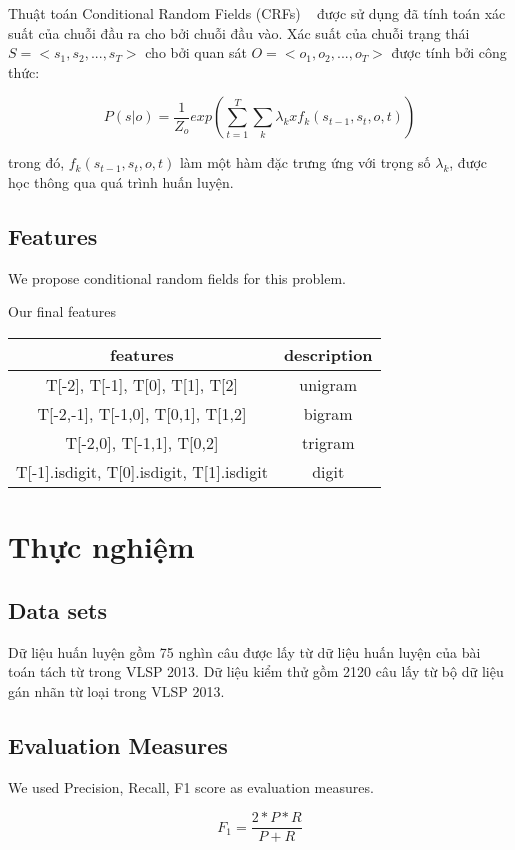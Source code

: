 \documentclass[11pt,a4paper]{article}
\begin{document}
Thuật toán Conditional Random Fields (CRFs) ~\cite{Lafferty:2001:CRF:645530.655813} được sử dụng đã tính toán xác suất của chuỗi đầu ra cho bởi chuỗi đầu vào. Xác suất của chuỗi trạng thái $S = <s_1, s_2,..., s_T>$ cho bởi quan sát $O = <o_1, o_2, ..., o_T>$ được tính bởi công thức:

$$P(s|o) = \frac{1}{Z_o} exp( \sum_{t=1}^{T} \sum_{k} \lambda_k x f_k (s_{t-1},s_t,o,t) )$$

trong đó, $f_k (s_{t-1},s_t,o,t)$ làm một hàm đặc trưng ứng với trọng số $\lambda_k$, được học thông qua quá trình huấn luyện.

\subsection{Features}
We propose conditional random fields for this problem.

Our final features
\begin{center}
\begin{tabular}{ |c|c| }
 \hline
 features & description \\
 \hline
 T[-2], T[-1], T[0], T[1], T[2] & unigram  \\
 T[-2,-1], T[-1,0], T[0,1], T[1,2] & bigram  \\
 T[-2,0], T[-1,1], T[0,2] & trigram \\
 T[-1].isdigit, T[0].isdigit, T[1].isdigit & digit
 \hline
\end{tabular}
\end{center}

\section{Thực nghiệm}

\subsection{Data sets}

Dữ liệu huấn luyện gồm 75 nghìn câu được lấy từ dữ liệu huấn luyện của bài toán tách từ trong VLSP 2013. Dữ liệu kiểm thử gồm 2120 câu lấy từ bộ dữ liệu gán nhãn từ loại trong VLSP 2013.

\subsection{Evaluation Measures}

We used Precision, Recall, F1 score as evaluation measures.

$$F_1 = \frac{2*P*R}{P + R}$$
\end{document}
